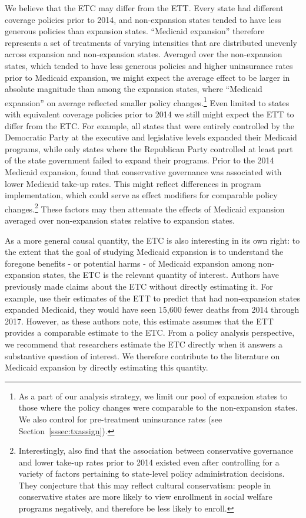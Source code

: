 \documentclass[aoas]{imsart}
\theoremstyle{plain}
\theoremstyle{remark}
\begin{document}
We believe that the ETC may differ from the ETT. Every state had different coverage policies prior to 2014, and non-expansion states tended to have less generous policies than expansion states. ``Medicaid expansion'' therefore represents a set of treatments of varying intensities that are distributed unevenly across expansion and non-expansion states. Averaged over the non-expansion states, which tended to have less generous policies and higher uninsurance rates prior to Medicaid expansion, we might expect the average effect to be larger in absolute magnitude than among the expansion states, where ``Medicaid expansion'' on average reflected smaller policy changes.\footnote{As a part of our analysis strategy, we limit our pool of expansion states to those where the policy changes were comparable to the non-expansion states. We also control for pre-treatment uninsurance rates (see Section~\ref{sssec:txassign}).} Even limited to states with equivalent coverage policies prior to 2014 we still might expect the ETT to differ from the ETC. For example, all states that were entirely controlled by the Democratic Party at the executive and legislative levels expanded their Medicaid programs, while only states where the Republican Party controlled at least part of the state government failed to expand their programs. Prior to the 2014 Medicaid expansion, \citet{sommers2012understanding} found that conservative governance was associated with lower Medicaid take-up rates. This might reflect differences in program implementation, which could serve as effect modifiers for comparable policy changes.\footnote{Interestingly, \citet{sommers2012understanding} also find that the association between conservative governance and lower take-up rates prior to 2014 existed even after controlling for a variety of factors pertaining to state-level policy administration decisions. They conjecture that this may reflect cultural conservatism: people in conservative states are more likely to view enrollment in social welfare programs negatively, and therefore be less likely to enroll.} These factors may then attenuate the effects of Medicaid expansion averaged over non-expansion states relative to expansion states.

As a more general causal quantity, the ETC is also interesting in its own right: to the extent that the goal of studying Medicaid expansion is to understand the foregone benefits - or potential harms - of Medicaid expansion among non-expansion states, the ETC is the relevant quantity of interest. Authors have previously made claims about the ETC without directly estimating it. For example, \citet{miller2021medicaid} use their estimates of the ETT to predict that had non-expansion states expanded Medicaid, they would have seen 15,600 fewer deaths from 2014 through 2017. However, as these authors note, this estimate assumes that the ETT provides a comparable estimate to the ETC. From a policy analysis perspective, we recommend that researchers estimate the ETC directly when it answers a substantive question of interest. We therefore contribute to the literature on Medicaid expansion by directly estimating this quantity.
\end{document}
